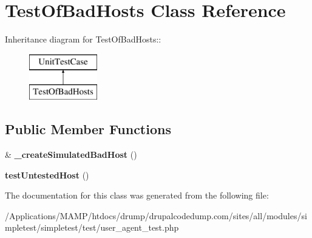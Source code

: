 \hypertarget{class_test_of_bad_hosts}{
\section{TestOfBadHosts Class Reference}
\label{class_test_of_bad_hosts}
}
Inheritance diagram for TestOfBadHosts::\begin{figure}[H]
\begin{center}
\leavevmode
\includegraphics[height=2cm]{class_test_of_bad_hosts}
\end{center}
\end{figure}
\subsection*{Public Member Functions}
\begin{DoxyCompactItemize}
\item 
\hypertarget{class_test_of_bad_hosts_a4726c83b56f089fb1b8c27175212e4ea}{
\& {\bfseries \_\-createSimulatedBadHost} ()}
\label{class_test_of_bad_hosts_a4726c83b56f089fb1b8c27175212e4ea}

\item 
\hypertarget{class_test_of_bad_hosts_a5c8e821b6eb9e714a4f66f1fd90eabe8}{
{\bfseries testUntestedHost} ()}
\label{class_test_of_bad_hosts_a5c8e821b6eb9e714a4f66f1fd90eabe8}

\end{DoxyCompactItemize}


The documentation for this class was generated from the following file:\begin{DoxyCompactItemize}
\item 
/Applications/MAMP/htdocs/drump/drupalcodedump.com/sites/all/modules/simpletest/simpletest/test/user\_\-agent\_\-test.php\end{DoxyCompactItemize}
